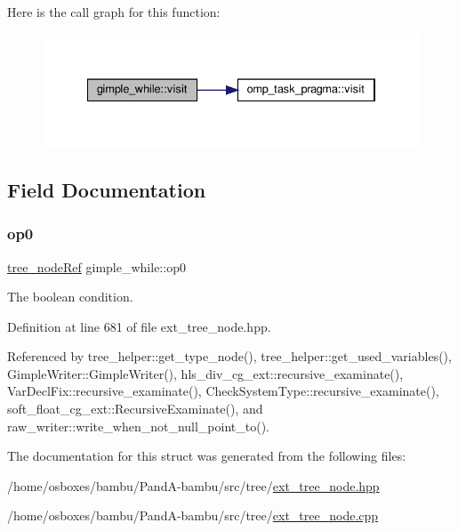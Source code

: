 Here is the call graph for this function\+:
\nopagebreak
\begin{figure}[H]
\begin{center}
\leavevmode
\includegraphics[width=334pt]{df/d5a/structgimple__while_a8fbe7b677d626e16026d600db417ef32_cgraph}
\end{center}
\end{figure}


\subsection{Field Documentation}
\mbox{\label{structgimple__while_a1eb1e3913ad0bc24b6927c81cdef4be2}} 
\subsubsection{\texorpdfstring{op0}{op0}}
{\footnotesize\ttfamily \hyperlink{tree__node_8hpp_a6ee377554d1c4871ad66a337eaa67fd5}{tree\+\_\+node\+Ref} gimple\+\_\+while\+::op0}



The boolean condition. 



Definition at line 681 of file ext\+\_\+tree\+\_\+node.\+hpp.



Referenced by tree\+\_\+helper\+::get\+\_\+type\+\_\+node(), tree\+\_\+helper\+::get\+\_\+used\+\_\+variables(), Gimple\+Writer\+::\+Gimple\+Writer(), hls\+\_\+div\+\_\+cg\+\_\+ext\+::recursive\+\_\+examinate(), Var\+Decl\+Fix\+::recursive\+\_\+examinate(), Check\+System\+Type\+::recursive\+\_\+examinate(), soft\+\_\+float\+\_\+cg\+\_\+ext\+::\+Recursive\+Examinate(), and raw\+\_\+writer\+::write\+\_\+when\+\_\+not\+\_\+null\+\_\+point\+\_\+to().



The documentation for this struct was generated from the following files\+:\begin{DoxyCompactItemize}
\item 
/home/osboxes/bambu/\+Pand\+A-\/bambu/src/tree/\hyperlink{ext__tree__node_8hpp}{ext\+\_\+tree\+\_\+node.\+hpp}\item 
/home/osboxes/bambu/\+Pand\+A-\/bambu/src/tree/\hyperlink{ext__tree__node_8cpp}{ext\+\_\+tree\+\_\+node.\+cpp}\end{DoxyCompactItemize}
